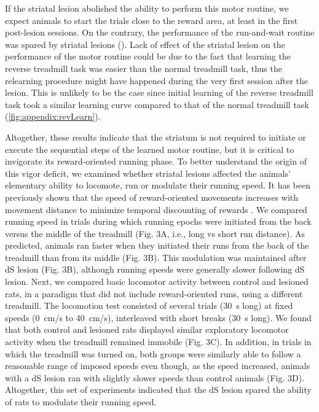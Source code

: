If the striatal lesion abolished the ability to perform this motor routine, we expect animals to start the trials close to the reward area, at least in the first post-lesion sessions.
On the contrary, the performance of the run-and-wait routine was spared by striatal lesions ().
Lack of effect of the striatal lesion on the performance of the motor routine could be due to the fact that learning the reverse treadmill task was easier than the normal treadmill task, thus the relearning procedure might have happened during the very first session after the lesion.
This is unlikely to be the case since initial learning of the reverse treadmill task took a similar learning curve compared to that of the normal treadmill task (\autoref{fig:appendix:revLearn}).


\par
Altogether, these results indicate that the striatum is not required to initiate or execute the sequential steps of the learned motor routine, but it is critical to invigorate its reward-oriented running phase.
To better understand the origin of this vigor deficit, we examined whether striatal lesions affected the animals' elementary ability to locomote, run or modulate their running speed.
It has been previously shown that the speed of reward-oriented movements increases with movement distance to minimize temporal discounting of rewards \cite{Shadmehr2010JN, Reppert2018JNPhys}.
We compared running speed in trials during which running epochs were initiated from the back versus the middle of the treadmill (Fig. 3A, i.e., long vs short run distance).
As predicted, animals ran faster when they initiated their runs from the back of the treadmill than from its middle (Fig. 3B). This modulation was maintained after dS lesion (Fig. 3B), although running speeds were generally slower following dS lesion.
Next, we compared basic locomotor activity between control and lesioned rats, in a paradigm that did not include reward-oriented runs, using a different treadmill.
The locomotion test consisted of several trials (30~s long) at fixed speeds (0~cm/s to 40~cm/s), interleaved with short breaks (30~s long).
We found that both control and lesioned rats displayed similar exploratory locomotor activity when the treadmill remained immobile (Fig. 3C).
In addition, in trials in which the treadmill was turned on, both groups were similarly able to follow a reasonable range of imposed speeds even though, as the speed increased, animals with a dS lesion ran with slightly slower speeds than control animals (Fig. 3D).
Altogether, this set of experiments indicated that the dS lesion spared the ability of rats to modulate their running speed.







